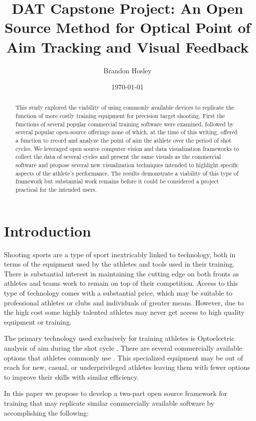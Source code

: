 \documentclass[conference]{IEEEtran}
\title{DAT Capstone Project: An Open Source Method for Optical Point of Aim Tracking and Visual Feedback}
\author{Brandon Hosley}
\date{\today}
\begin{document}
	\maketitle
	
\begin{abstract}
This study explored the viability of using commonly available devices to replicate the function of more costly training equipment for precision target shooting.
First the functions of several popular commercial training software were examined,
followed by several popular open-source offerings none of which, at the time of this writing, offered a function to record and analyze the point of aim the athlete over the period of shot cycles.
We leveraged open source computer vision and data visualization frameworks to collect the data of several cycles and present the same visuals as the commercial software and propose several new visualization techniques intended to highlight specific aspects of the athlete's performance.
The results demonstrate a viability of this type of framework but substantial work remains before it could be considered a project practical for the intended users.
\end{abstract}

\section{Introduction}

Shooting sports are a type of sport inextricably linked to technology, 
both in terms of the equipment used by the athletes and tools used in their training.
There is substantial interest in maintaining the cutting edge on both fronts as athletes and teams work to remain on top of their competition.
Access to this type of technology comes with a substantial price, which may be suitable to professional athletes or clubs and individuals of greater means.
However, due to the high cost some highly talented athletes may never get access to high quality equipment or training.

The primary technology used exclusively for training athletes is Optoelectric analysis of aim during the shot cycle \cite{Mononen2003, Simo2018}.
There are several commercially available options that athletes commonly use \cite{scatt, noptel}.
This specialized equipment may be out of reach for new, casual, or underprivileged athletes leaving them with fewer options to improve their skills with similar efficiency.

In this paper we propose to develop a two-part open source framework for training that may replicate similar commercially available software by accomplishing the following:
\end{document}
